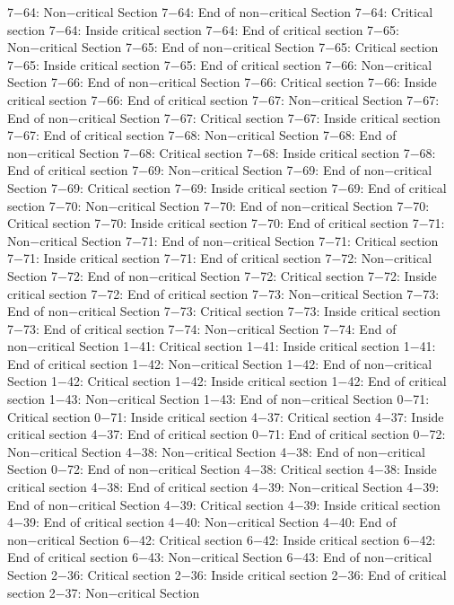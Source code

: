 7−64: Non−critical Section
7−64: End of non−critical Section
7−64: Critical section
7−64: Inside critical section
7−64: End of critical section
7−65: Non−critical Section
7−65: End of non−critical Section
7−65: Critical section
7−65: Inside critical section
7−65: End of critical section
7−66: Non−critical Section
7−66: End of non−critical Section
7−66: Critical section
7−66: Inside critical section
7−66: End of critical section
7−67: Non−critical Section
7−67: End of non−critical Section
7−67: Critical section
7−67: Inside critical section
7−67: End of critical section
7−68: Non−critical Section
7−68: End of non−critical Section
7−68: Critical section
7−68: Inside critical section
7−68: End of critical section
7−69: Non−critical Section
7−69: End of non−critical Section
7−69: Critical section
7−69: Inside critical section
7−69: End of critical section
7−70: Non−critical Section
7−70: End of non−critical Section
7−70: Critical section
7−70: Inside critical section
7−70: End of critical section
7−71: Non−critical Section
7−71: End of non−critical Section
7−71: Critical section
7−71: Inside critical section
7−71: End of critical section
7−72: Non−critical Section
7−72: End of non−critical Section
7−72: Critical section
7−72: Inside critical section
7−72: End of critical section
7−73: Non−critical Section
7−73: End of non−critical Section
7−73: Critical section
7−73: Inside critical section
7−73: End of critical section
7−74: Non−critical Section
7−74: End of non−critical Section
1−41: Critical section
1−41: Inside critical section
1−41: End of critical section
1−42: Non−critical Section
1−42: End of non−critical Section
1−42: Critical section
1−42: Inside critical section
1−42: End of critical section
1−43: Non−critical Section
1−43: End of non−critical Section
0−71: Critical section
0−71: Inside critical section
4−37: Critical section
4−37: Inside critical section
4−37: End of critical section
0−71: End of critical section
0−72: Non−critical Section
4−38: Non−critical Section
4−38: End of non−critical Section
0−72: End of non−critical Section
4−38: Critical section
4−38: Inside critical section
4−38: End of critical section
4−39: Non−critical Section
4−39: End of non−critical Section
4−39: Critical section
4−39: Inside critical section
4−39: End of critical section
4−40: Non−critical Section
4−40: End of non−critical Section
6−42: Critical section
6−42: Inside critical section
6−42: End of critical section
6−43: Non−critical Section
6−43: End of non−critical Section
2−36: Critical section
2−36: Inside critical section
2−36: End of critical section
2−37: Non−critical Section
